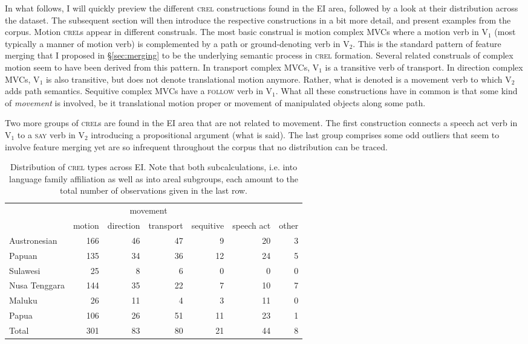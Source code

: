 In what follows, I will quickly preview the different \textsc{crel} constructions found in the EI area, followed by a look at their distribution across the dataset. The subsequent section will then introduce the respective constructions in a bit more detail, and present examples from the corpus. Motion \textsc{crel}s appear in different construals. The most basic construal is motion complex MVCs where a motion verb in V$_1$ (most typically a manner of motion verb) is complemented by a path or ground-denoting verb in V$_2$. This is the standard pattern of feature merging that I  proposed in §\ref{sec:merging} to be the underlying semantic process in \textsc{crel} formation. Several related construals of complex motion seem to have been derived from this pattern. In transport complex MVCs, V$_1$ is a transitive verb of transport. In direction complex MVCs, V$_1$ is also transitive, but does not denote translational motion anymore. Rather, what is denoted is a movement verb to which V$_2$ adds path semantics. Sequitive complex MVCs have a \textsc{follow} verb in V$_1$. What all these constructions have in common is that some kind of \emph{movement} is involved, be it translational motion proper or movement of manipulated objects along some path.

Two more groups of \textsc{crel}s are found in the EI area that are not related to movement. The first construction connects a speech act verb in V$_1$ to a \textsc{say} verb in V$_2$ introducing a propositional argument (what is said). The last group comprises some odd outliers that seem to involve feature merging yet are so infrequent throughout the corpus that no distribution can be traced.

\begin{table}


\begin{tabular}{lrrrrrr}
  \lsptoprule
& \multicolumn{4}{c|}{movement} & & \\
 & {motion} & {direction} & {transport} & {sequitive} & {speech act} & {other}\\  
  \hline
  Austronesian & 166 & 46 & 47 & 9 & 20 & 3 \tabularnewline
  Papuan & 135 & 34 &  36 &  12 & 24 & 5 \tabularnewline
   \hline
  Sulawesi & 25 & 8 & 6 & 0 & 0 & 0 \tabularnewline
  Nusa Tenggara & 144 & 35 & 22 & 7 & 10 & 7 \tabularnewline
  Maluku & 26 & 11 & 4 & 3 & 11 & 0 \tabularnewline 
  Papua & 106 & 26 & 51 & 11 & 23 & 1 \tabularnewline 
\lsptoprule
Total & 301 & 83 & 80 & 21 & 44 & 8 \tabularnewline
\hline
\end{tabular}
\caption[Distribution of \textsc{crel} types]{Distribution of \textsc{crel} types across EI. Note that both subcalculations, i.e. into language family affiliation as well as into areal subgroups, each amount to the total number of observations given in the last row.}
\label{table:CREL_overview}


\end{table}


